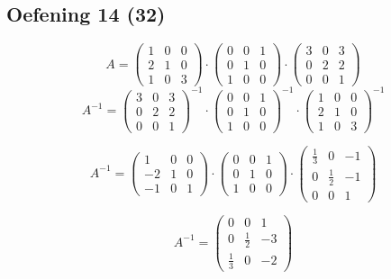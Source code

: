 \documentclass[lineaire_algebra_oplossingen.tex]{subfiles}
\begin{document}
\subsection{Oefening 14 (32)}
$$
A = 
\begin{pmatrix}
1 & 0 & 0\\
2 & 1 & 0\\
1 & 0 & 3
\end{pmatrix}
\cdot
\begin{pmatrix}
0 & 0 & 1\\
0 & 1 & 0\\
1 & 0 & 0
\end{pmatrix}
\cdot
\begin{pmatrix}
3 & 0 & 3\\
0 & 2 & 2\\
0 & 0 & 1  
\end{pmatrix}
$$
$$
A^{-1} = 
\begin{pmatrix}
3 & 0 & 3\\
0 & 2 & 2\\
0 & 0 & 1  
\end{pmatrix}^{-1}
\cdot
\begin{pmatrix}
0 & 0 & 1\\
0 & 1 & 0\\
1 & 0 & 0
\end{pmatrix}^{-1}
\cdot
\begin{pmatrix}
1 & 0 & 0\\
2 & 1 & 0\\
1 & 0 & 3
\end{pmatrix}^{-1}
$$

$$
A^{-1}=
\begin{pmatrix}
1 & 0 & 0\\
-2 & 1 & 0\\
-1 & 0 & 1
\end{pmatrix}
\cdot
\begin{pmatrix}
0 & 0 & 1\\
0 & 1 & 0\\
1 & 0 & 0
\end{pmatrix}
\cdot
\begin{pmatrix}
\frac{1}{3} & 0 & -1\\
0 & \frac{1}{2} & -1\\
0 & 0 & 1
\end{pmatrix}
$$

$$
A^{-1}=
\begin{pmatrix}
0 & 0 & 1\\
0 & \frac{1}{2} & -3\\
\frac{1}{3} & 0 & -2
\end{pmatrix}
$$
\end{document}
